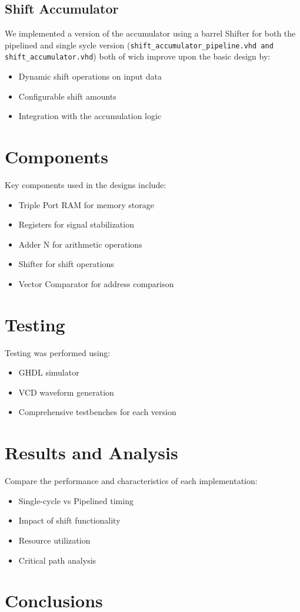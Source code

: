 \documentclass[a4paper,12pt]{article}
\begin{document}
\subsection{Shift Accumulator}
We implemented a version of the accumulator using a barrel Shifter for both the pipelined and single sycle version (\texttt{shift\_accumulator\_pipeline.vhd and shift\_accumulator.vhd}) both of wich improve upon the basic design by:
\begin{itemize}
    \item Dynamic shift operations on input data
    \item Configurable shift amounts
    \item Integration with the accumulation logic
\end{itemize}


\section{Components}
Key components used in the designs include:
\begin{itemize}
    \item Triple Port RAM for memory storage
    \item Registers for signal stabilization
    \item Adder N for arithmetic operations
    \item Shifter for shift operations
    \item Vector Comparator for address comparison
\end{itemize}

\section{Testing}
Testing was performed using:
\begin{itemize}
    \item GHDL simulator
    \item VCD waveform generation
    \item Comprehensive testbenches for each version
\end{itemize}

\section{Results and Analysis}
Compare the performance and characteristics of each implementation:
\begin{itemize}
    \item Single-cycle vs Pipelined timing
    \item Impact of shift functionality
    \item Resource utilization
    \item Critical path analysis
\end{itemize}

\section{Conclusions}
\end{document}
